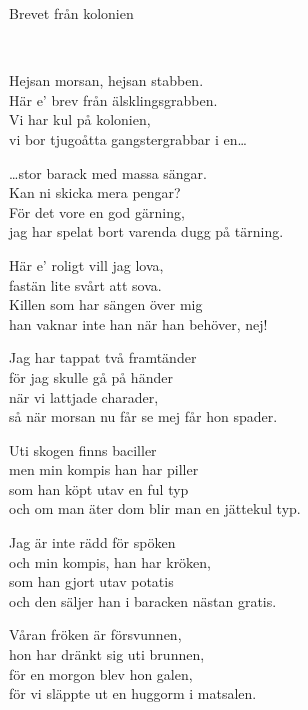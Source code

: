 \begin{song}{Brevet från kolonien}
	
	
	\\
	

    \showversenumber	
	Hejsan morsan, hejsan stabben.\\
	Här e' brev från älsklingsgrabben.\\
	Vi har kul på kolonien,\\
	vi bor tjugoåtta gangstergrabbar i en\ldots{}
	
    \showversenumber
	\ldots{}stor barack med massa sängar.\\
	Kan ni skicka mera pengar?\\
	För det vore en god gärning,\\
	jag har spelat bort varenda dugg på tärning.
	
    \showversenumber
	Här e' roligt vill jag lova,\\
	fastän lite svårt att sova.\\
	Killen som har sängen över mig\\
	han vaknar inte han när han behöver, nej!
	
    \showversenumber
	Jag har tappat två framtänder\\
	för jag skulle gå på händer\\
	när vi lattjade charader,\\
	så när morsan nu får se mej får hon spader.
	
    \showversenumber
	Uti skogen finns baciller\\
	men min kompis han har piller\\
	som han köpt utav en ful typ\\
	och om man äter dom blir man en jättekul typ.
	
    \showversenumber
	Jag är inte rädd för spöken\\
	och min kompis, han har kröken,\\
	som han gjort utav potatis\\
	och den säljer han i baracken nästan gratis.
	
    \showversenumber
	Våran fröken är försvunnen,\\
	hon har dränkt sig uti brunnen,\\
	för en morgon blev hon galen,\\
	för vi släppte ut en huggorm i matsalen.
	

\end{song}
